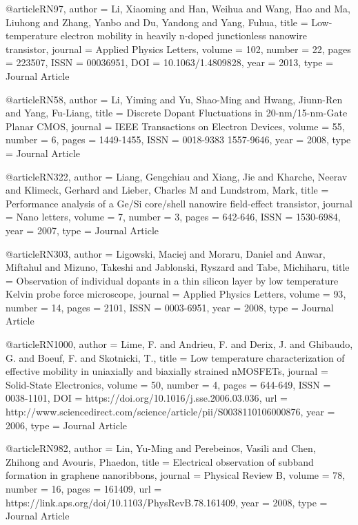 @article{RN97,
   author = {Li, Xiaoming and Han, Weihua and Wang, Hao and Ma, Liuhong and Zhang, Yanbo and Du, Yandong and Yang, Fuhua},
   title = {Low-temperature electron mobility in heavily n-doped junctionless nanowire transistor},
   journal = {Applied Physics Letters},
   volume = {102},
   number = {22},
   pages = {223507},
   ISSN = {00036951},
   DOI = {10.1063/1.4809828},
   year = {2013},
   type = {Journal Article}
}

@article{RN58,
   author = {Li, Yiming and Yu, Shao-Ming and Hwang, Jiunn-Ren and Yang, Fu-Liang},
   title = {Discrete Dopant Fluctuations in 20-nm/15-nm-Gate Planar CMOS},
   journal = {IEEE Transactions on Electron Devices},
   volume = {55},
   number = {6},
   pages = {1449-1455},
   ISSN = {0018-9383
1557-9646},
   year = {2008},
   type = {Journal Article}
}

@article{RN322,
   author = {Liang, Gengchiau and Xiang, Jie and Kharche, Neerav and Klimeck, Gerhard and Lieber, Charles M and Lundstrom, Mark},
   title = {Performance analysis of a Ge/Si core/shell nanowire field-effect transistor},
   journal = {Nano letters},
   volume = {7},
   number = {3},
   pages = {642-646},
   ISSN = {1530-6984},
   year = {2007},
   type = {Journal Article}
}

@article{RN303,
   author = {Ligowski, Maciej and Moraru, Daniel and Anwar, Miftahul and Mizuno, Takeshi and Jablonski, Ryszard and Tabe, Michiharu},
   title = {Observation of individual dopants in a thin silicon layer by low temperature Kelvin probe force microscope},
   journal = {Applied Physics Letters},
   volume = {93},
   number = {14},
   pages = {2101},
   ISSN = {0003-6951},
   year = {2008},
   type = {Journal Article}
}

@article{RN1000,
   author = {Lime, F. and Andrieu, F. and Derix, J. and Ghibaudo, G. and Boeuf, F. and Skotnicki, T.},
   title = {Low temperature characterization of effective mobility in uniaxially and biaxially strained nMOSFETs},
   journal = {Solid-State Electronics},
   volume = {50},
   number = {4},
   pages = {644-649},
   ISSN = {0038-1101},
   DOI = {https://doi.org/10.1016/j.sse.2006.03.036},
   url = {http://www.sciencedirect.com/science/article/pii/S0038110106000876},
   year = {2006},
   type = {Journal Article}
}

@article{RN982,
   author = {Lin, Yu-Ming and Perebeinos, Vasili and Chen, Zhihong and Avouris, Phaedon},
   title = {Electrical observation of subband formation in graphene nanoribbons},
   journal = {Physical Review B},
   volume = {78},
   number = {16},
   pages = {161409},
   url = {https://link.aps.org/doi/10.1103/PhysRevB.78.161409},
   year = {2008},
   type = {Journal Article}
}

